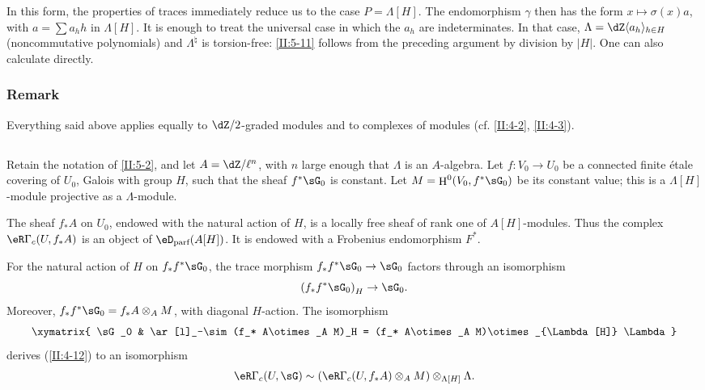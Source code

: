 \documentclass[12pt,oneside,english]{smfbook}
\DeclareMathOperator{\h}{H}
\begin{document}
In this form, the properties of traces immediately reduce us to the case $P=\Lambda[H]$. The endomorphism $\gamma$ then has the form $x\mapsto\sigma(x)a$, with $a=\sum a_hh$ in $\Lambda[H]$. It is enough to treat the universal case in which the $a_h$ are indeterminates. In that case, $\Lambda=\dZ\langle a_h\rangle_{h\in H}$ (noncommutative polynomials) and $\Lambda^\natural$ is torsion-free: \ref{II:5-11} follows from the preceding argument by division by $|H|$. One can also calculate directly.

\subsubsection{Remark}\label{II:5-11-1}

Everything said above applies equally to $\dZ/2$-graded modules and to complexes of modules (cf. \ref{II:4-2}, \ref{II:4-3}).

\subsection{}\label{II:5-12}

Retain the notation of \ref{II:5-2}, and let $A=\dZ/\ell^n$, with $n$ large enough that $\Lambda$ is an $A$-algebra. Let $f:V_0\to U_0$ be a connected finite étale covering of $U_0$, Galois with group $H$, such that the sheaf $f^*\sG_0$ is constant. Let $M=\h^0(V_0,f^*\sG_0)$ be its constant value; this is a $\Lambda[H]$-module projective as a $\Lambda$-module.

The sheaf $f_*A$ on $U_0$, endowed with the natural action of $H$, is a locally free sheaf of rank one of $A[H]$-modules. Thus the complex $\eR\Gamma_c(U,f_*A)$ is an object of $\eD_\text{parf}(A[H])$. It is endowed with a Frobenius endomorphism $F^*$.

For the natural action of $H$ on $f_*f^*\sG_0$, the trace morphism $f_*f^*\sG_0\to\sG_0$ factors through an isomorphism
\[
  \left(f_* f^*\sG_0\right)_H \to \sG_0 \text{.}
\]
Moreover, $f_*f^*\sG_0=f_*A\otimes_AM$, with diagonal $H$-action. The isomorphism
\[\xymatrix{
  \sG_0
    & \ar[l]_-\sim (f_* A\otimes_A M)_H = (f_* A\otimes_A M)\otimes_{\Lambda[H]} \Lambda
}\]
derives (\ref{II:4-12}) to an isomorphism
\[
  \eR\Gamma_c(U,\sG) \sim \left(\eR\Gamma_c(U,f_* A)\otimes_A M\right)\otimes_{\Lambda[H]} \Lambda \text{.}
\]
\end{document}
